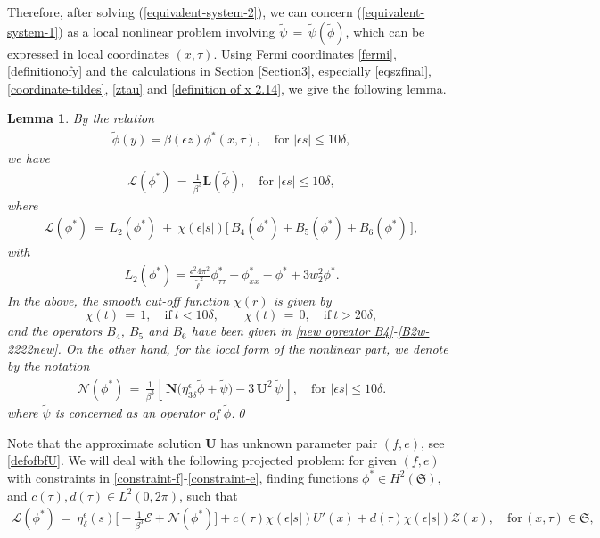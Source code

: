 \documentclass[10pt, reqno]{amsart}
\numberwithin{equation}{section}
\newtheorem{lemma}[theorem]{Lemma}
\theoremstyle{definition}
\begin{document}
{{Therefore, after solving (\ref{equivalent-system-2}),
we can concern (\ref{equivalent-system-1}) as a local nonlinear problem involving ${\tilde\psi} \,=\, { \tilde \psi}({\tilde\phi})$,
which can be expressed in local coordinates $(x, \tau)$.
Using Fermi coordinates \eqref{fermi}, \eqref{definitionofy} and the calculations in Section \ref{Section3}, especially \eqref{eqszfinal}, \eqref{coordinate-tildes}, \eqref{ztau} and \eqref{definition of x 2.14}, we give the following lemma.
\begin{lemma}
By the relation
\begin{align}
{\tilde\phi}(y) = \beta(\epsilon z) \phi^*(x, \tau), \quad \text{for $|\epsilon s|\leq 10\delta$},
\label{relation betwen tildephi and phi}
\end{align}
we have
\begin{align}
\mathcal L \left(\phi^*\right)
\,=\,
\frac{1}{\beta^3}\mathbf{L}({\tilde\phi}), \quad \text{for $|\epsilon s|\leq 10\delta$},
\end{align}
where
\begin{align}\label{expression of mathcal L}
\mathcal L (\phi^*) \,=\, L_2(\phi^*) \ +\ \chi(\epsilon|s|) \big[\, B_4(\phi^*)+ B_5(\phi^*)+ B_6(\phi^*)\,\big],
\end{align}
with
\begin{align}\label{definition of L2operator}
 L_2(\phi^*) = \frac{\epsilon^2 4\pi^2}{{\tilde\ell}^2} \phi^*_{\tau\tau} + \phi^*_{xx} - \phi^*+ 3w_2^2 \phi^*.
\end{align}
In the above, the smooth cut-off function $\chi (r)$ is given by
$$
\chi(t) \,=\, 1, \quad \text{if}~t<10\delta, \qquad \chi(t) \,=\, 0, \quad\text{if}\ t>20\delta,
$$
and the operators $B_4$, $B_5$ and $B_6$ have been given in \eqref{new opreator B4}-\eqref{B2w-2222new}.
On the other hand, for the local form of the nonlinear part, we denote by the notation
\begin{align}\label{Nmathcal0}
{\mathcal N}(\phi^*)
\,=\,
\frac{1}{\beta^3}\left[\, \mathbf{N}\big(\eta_{3\delta}^{\epsilon}{\tilde\phi}+{\tilde\psi}\big) -3\, \mathbf{U}^2 \, {\tilde\psi} \,\right],
 \quad \text{for $|\epsilon s|\leq 10\delta$}.
\end{align}
where ${\tilde\psi}$ is concerned as an operator of $\tilde\phi$.\qed
\end{lemma}


\medskip
Note that the approximate solution $\mathbf{U}$ has unknown parameter pair $(f, e)$, see \eqref{defofbfU}.
We will deal with the following projected problem:
for given $(f, e)$ with constraints in \eqref{constraint-f}-\eqref{constraint-e}, finding
functions $\phi^*\in H^2({\mathfrak S})$, \, and $c(\tau), d(\tau) \in L^2(0, 2\pi)$,
such that
\begin{align} \label{project 6.13}
\mathcal L (\phi^*) \,=\, \eta_\delta^\epsilon(s) \Big[-\frac{1}{\beta^3}{\mathcal E} + {\mathcal N}(\phi^*)\Big]
+ c(\tau) \chi(\epsilon|s|) U'(x)+ d(\tau) \chi(\epsilon|s|){\mathcal Z}(x), \quad \text{for}\,(x, \tau)\in \mathfrak S,
\end{align}

}}
\end{document}
